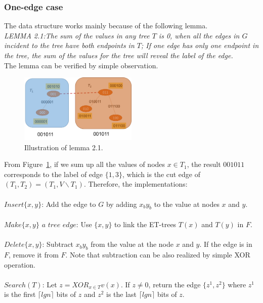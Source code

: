 \documentclass[conference,compsoc]{IEEEtran}
\begin{document}
\subsubsection*{One-edge case}
The data structure works mainly because of the following lemma.\\
\textit{LEMMA 2.1:The sum of the values in any tree $T$ is 0, when all the edges in $G$ incident to the tree have both endpoints in $T$; If one edge has only one endpoint in the tree, the sum of the values for the tree will reveal the label of the edge.}\\
The lemma can be verified by simple observation.
\begin{figure}[H]
	\centering
	\includegraphics[width=0.5\textwidth]{Pic/5.png}
	\caption{ Illustration of lemma 2.1.}
	\label{fig:5}
\end{figure}
From Figure~\ref{fig:5}, if we sum up all the values of nodes $x \in T_1$, the result $001011$ corresponds to the label of edge $\{1,3\}$, which is the cut edge of $(T_1,T_2)=(T_1,V\backslash T_1)$. Therefore, the implementations:\\\\
$Insert\{x,y\}$: Add the edge to $G$ by adding $x_by_b$ to the value at nodes $x$ and $y$.\\\\
$Make \{x,y\}$ $a$ $tree$ $edge$: Use $\{x,y\}$ to link the ET-trees $T(x)$ and $T(y)$ in $F$.\\\\
$Delete\{x,y\}$: Subtract $x_by_b$ from the value at the node $x$ and $y$. If the edge is in $F$, remove it from $F$. Note that subtraction can be also realized by simple XOR operation.\\\\
$Search(T)$: Let $z=XOR_{x\in T}v(x)$. If $z \neq 0$, return the edge $\{z^1,z^2\}$ where $z^1$ is the first $\lceil lgn \rceil$ bits of $z$ and $z^2$ is the last $\lceil lgn \rceil$ bits of $z$.
\end{document}
